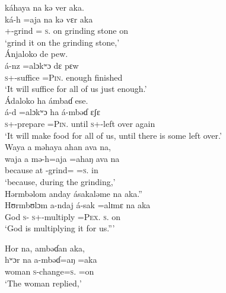 \medskip
káhaya  na  kə  ver  aka.\\
\gll ká-h    =aja   na       kə  vɛr        aka\\
{\twoS}+{\IFV}-grind  ={\PLU}  \textsc{s}.{\DO}  on   {grinding stone}  on\\
\glt ‘grind it on the grinding stone,’\\

\medskip
Ánjaloko  de  pew. \\
\gll á-nz      =alɔkʷɔ dɛ     pɛw\\
\textsc{s}+{\IFV}-suffice  =\textsc{Pin}.{\IO}    enough  finished\\
\glt ‘It will suffice for all of us just enough.’ \\

\medskip
 Ádaloko  ha  ámbaɗ  ese.\\
\gll á-d      =alɔkʷɔ ha      á-mbəɗ ɛʃɛ\\
\textsc{s}+{\IFV}-prepare  =\textsc{Pin}.{\IO}  until   {\textsc{s}+{\IFV}-left over}  again\\ 
\glt ‘It will make food for all of us, until there is some left over.’\\

\medskip
  Waya  a  məhaya  ahan  ava  na,\\
\gll waja   a    mə-h=aja =ahaŋ ava na\\
because  at   {\NOM}{}-grind={\PLU}     =\textsc{s}.{\POSS}   in   {\PSP}\\
\glt ‘because, during the grinding,’\\
\clearpage
\medskip
 Hərmbəlom  anday  ásakaləme  na  aka.”\\
\gll Hʊrmbʊlɔm   a-ndaj    á-sak    =alɪmɛ     na  aka\\
God                \textsc{s}-{\PRG}  \textsc{s}+{\IFV}-multiply  =\textsc{Pex}.{\IO}  \textsc{s}.{\DO}  on \\
\glt ‘God is multiplying it for us.”’\\
\z

\ea   Hor  na,  ambəɗan  aka,   \\
\gll hʷɔr na a-mbəɗ=aŋ =aka\\
woman {\PSP}  \textsc{s}-change=\textsc{s}.{\IO}    =on\\
\glt ‘The woman replied,’\\
\z

